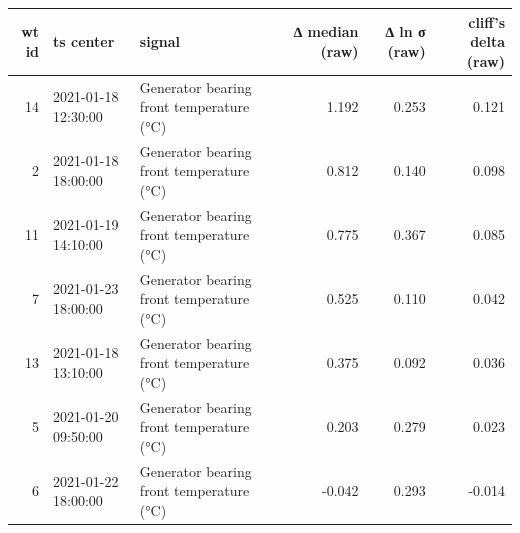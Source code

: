\begin{tabular}{rllrrr}
\toprule
wt id & ts center & signal & ∆ median (raw) & ∆ ln σ  (raw) & cliff's delta (raw) \\
\midrule
14 & 2021-01-18 12:30:00 & Generator bearing front temperature (°C) & 1.192 & 0.253 & 0.121 \\
2 & 2021-01-18 18:00:00 & Generator bearing front temperature (°C) & 0.812 & 0.140 & 0.098 \\
11 & 2021-01-19 14:10:00 & Generator bearing front temperature (°C) & 0.775 & 0.367 & 0.085 \\
7 & 2021-01-23 18:00:00 & Generator bearing front temperature (°C) & 0.525 & 0.110 & 0.042 \\
13 & 2021-01-18 13:10:00 & Generator bearing front temperature (°C) & 0.375 & 0.092 & 0.036 \\
5 & 2021-01-20 09:50:00 & Generator bearing front temperature (°C) & 0.203 & 0.279 & 0.023 \\
6 & 2021-01-22 18:00:00 & Generator bearing front temperature (°C) & -0.042 & 0.293 & -0.014 \\
\bottomrule
\end{tabular}
